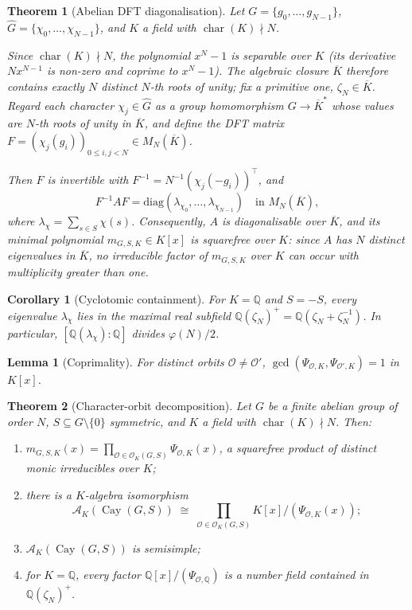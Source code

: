 \documentclass[10pt,a4paper]{amsart}
\newtheorem{theorem}{Theorem}
\newtheorem{corollary}{Corollary}
\newtheorem{lemma}{Lemma}
\DeclareMathOperator{\Cay}{Cay}
\newcommand{\Ghat}{\widehat{G}}
\newcommand{\Q}{\mathbb{Q}}
\newcommand{\calA}{\mathcal{A}}
\newcommand{\calO}{\mathcal{O}}
\DeclareMathOperator{\ch}{char}
\begin{document}
\begin{theorem}[Abelian DFT diagonalisation]
\label{thm:dft}
Let $G = \{g_0, \ldots, g_{N-1}\}$, $\Ghat = \{\chi_0, \ldots, \chi_{N-1}\}$,
and $K$ a field with $\ch(K) \nmid N$.

Since $\ch(K) \nmid N$, the polynomial $x^N - 1$ is separable over $K$
(its derivative $N x^{N-1}$ is non-zero and coprime to $x^N - 1$).
The algebraic closure $\overline{K}$ therefore contains exactly $N$ distinct
$N$-th roots of unity; fix a primitive one, $\zeta_N \in \overline{K}$.
Regard each character $\chi_j \in \Ghat$ as a group homomorphism
$G \to \overline{K}^*$ whose values are $N$-th roots of unity in $\overline{K}$,
and define the \emph{DFT matrix}
$F = (\chi_j(g_i))_{0 \le i,j < N} \in M_N(\overline{K})$.

Then $F$ is invertible with
$F^{-1} = N^{-1}(\chi_j(-g_i))^\top$, and
\begin{equation}
\label{eq:Fdiag}
  F^{-1} A F = \mathrm{diag}(\lambda_{\chi_0}, \ldots, \lambda_{\chi_{N-1}})
  \quad \text{in } M_N(\overline{K}),
\end{equation}
where $\lambda_\chi = \sum_{s \in S} \chi(s)$.
Consequently, $A$ is diagonalisable over $\overline{K}$, and its minimal
polynomial $m_{G,S,K} \in K[x]$ is squarefree over $K$: since $A$ has $N$
distinct eigenvalues in $\overline{K}$, no irreducible factor of $m_{G,S,K}$
over $K$ can occur with multiplicity greater than one.
\end{theorem}

\begin{corollary}[Cyclotomic containment]
\label{cor:cyclo}
For $K = \Q$ and $S = -S$, every eigenvalue $\lambda_\chi$ lies in the
maximal real subfield $\Q(\zeta_N)^+ = \Q(\zeta_N + \zeta_N^{-1})$.
In particular, $[\Q(\lambda_\chi) : \Q]$ divides $\varphi(N)/2$.
\end{corollary}

\begin{lemma}[Coprimality]
\label{lem:coprime}
For distinct orbits $\calO \ne \calO'$,
$\gcd(\Psi_{\calO,K}, \Psi_{\calO',K}) = 1$ in $K[x]$.
\end{lemma}

\begin{theorem}[Character-orbit decomposition]
\label{thm:main}
Let $G$ be a finite abelian group of order $N$, $S \subseteq G
\setminus \{0\}$ symmetric, and $K$ a field with $\ch(K) \nmid N$.  Then:
\begin{enumerate}[label=\textup{(\roman*)}]
  \item $m_{G,S,K}(x) = \prod_{\calO \in \calO_K(G,S)} \Psi_{\calO,K}(x)$,
        a squarefree product of distinct monic irreducibles over $K$;
  \item there is a $K$-algebra isomorphism
        \[
          \calA_K(\Cay(G,S))
          \;\cong\;
          \prod_{\calO \in \calO_K(G,S)} K[x]/(\Psi_{\calO,K}(x));
        \]
  \item $\calA_K(\Cay(G,S))$ is semisimple;
  \item for $K = \Q$, every factor $\Q[x]/(\Psi_{\calO,\Q})$ is a number
        field contained in $\Q(\zeta_N)^+$.
\end{enumerate}
\end{theorem}
\end{document}
